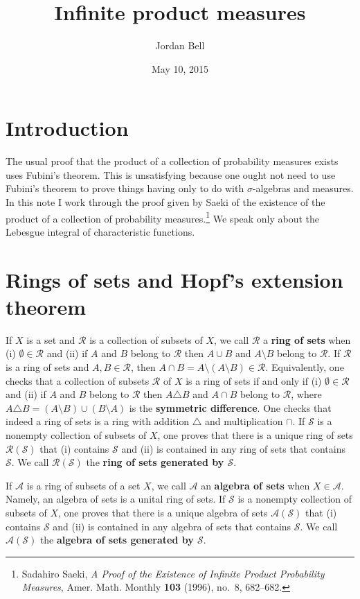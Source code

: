 \documentclass{article}
\theoremstyle{definition}
\begin{document}
\title{Infinite product measures}
\author{Jordan Bell}
\date{May 10, 2015}

\maketitle

\section{Introduction}
The usual proof that the product of a collection of probability measures exists uses Fubini's theorem. This is unsatisfying because one ought not need to use Fubini's theorem
to prove things having only to do with $\sigma$-algebras and measures. In this note I work through the proof given by Saeki of the existence of the product of a collection
of probability measures.\footnote{Sadahiro Saeki, {\em A Proof of the Existence of Infinite Product Probability Measures}, Amer. Math. Monthly \textbf{103} (1996), no.~8, 682--682.}
 We  speak only about the Lebesgue integral of characteristic functions.

\section{Rings of sets and Hopf's extension theorem}
If $X$ is a set and $\mathscr{R}$ is a collection of subsets of $X$, we call $\mathscr{R}$ a \textbf{ring of sets} when
(i) $\emptyset \in \mathscr{R}$ and (ii) if $A$ and $B$ belong to $\mathscr{R}$ then $A \cup B$ and $A \setminus B$ belong to $\mathscr{R}$.
If $\mathscr{R}$ is a ring of sets and $A, B \in \mathscr{R}$, then $A \cap B = A \setminus (A \setminus B) \in \mathscr{R}$. Equivalently, one checks
that a collection of subsets $\mathscr{R}$ of $X$ is a ring of sets if and only if (i) $\emptyset \in \mathscr{R}$ and (ii) if
$A$ and $B$ belong to $\mathscr{R}$ then $A \triangle B$ and $A \cap B$ belong to $\mathscr{R}$, where
$A \triangle B = (A \setminus B) \cup (B \setminus A)$ is the \textbf{symmetric difference}. One checks that
indeed a ring of sets is a ring with addition $\triangle$ and multiplication $\cap$.
If $\mathscr{S}$ is a nonempty collection of subsets of $X$, one proves that there is a unique ring of sets $\mathscr{R}(\mathscr{S})$ 
that (i) contains $\mathscr{S}$  and (ii) is contained in any ring of sets that contains $\mathscr{S}$. We call $\mathscr{R}(\mathscr{S})$ the \textbf{ring
of sets generated by $\mathscr{S}$}.

If $\mathscr{A}$ is a ring of subsets of a set $X$, we call $\mathscr{A}$ an \textbf{algebra of sets} when $X \in \mathscr{A}$. Namely, an algebra of sets is a unital
ring of sets. If $\mathscr{S}$ is a nonempty collection of subsets of $X$, one proves that there is a unique algebra of sets
$\mathscr{A}(\mathscr{S})$ that (i) contains $\mathscr{S}$ and (ii) is contained in any algebra of sets that contains $\mathscr{S}$. We call
$\mathscr{A}(\mathscr{S})$ the \textbf{algebra of sets generated by $\mathscr{S}$}.
\end{document}

